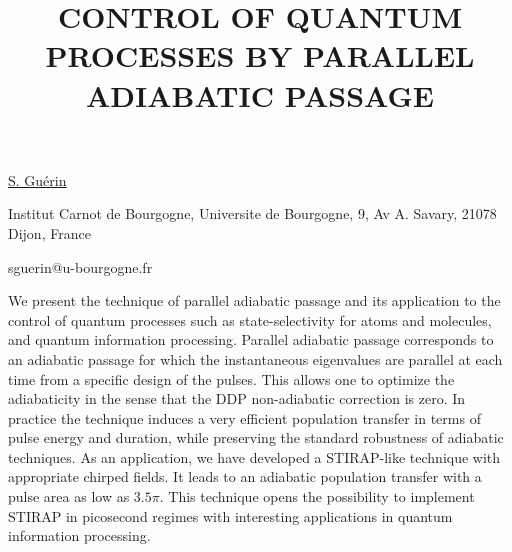 \title{CONTROL OF QUANTUM PROCESSES BY PARALLEL \mbox{ADIABATIC} \mbox{PASSAGE}}

\underline{S. Gu\'erin} 

{\normalsize{\vspace{-4mm}
Institut Carnot de Bourgogne, Universite de Bourgogne, 9, Av A.
Savary, 21078 Dijon, France

\email sguerin@u-bourgogne.fr}}

We present the technique of parallel adiabatic passage and its
application to the control of quantum processes such as
state-selectivity for atoms and molecules, and quantum information
processing. Parallel adiabatic passage corresponds to an adiabatic
passage for which the instantaneous eigenvalues are parallel at each
time from a specific design of the pulses. This allows one to
optimize the adiabaticity in the sense that the DDP non-adiabatic
correction is zero. In practice the technique induces a very
efficient population transfer in terms of pulse energy and duration,
while preserving the standard robustness of adiabatic techniques. As
an application, we have developed a STIRAP-like technique with
appropriate chirped fields. It leads to an adiabatic population
transfer with a pulse area as low as $3.5\pi$. This technique opens
the possibility to implement STIRAP in picosecond regimes with
interesting applications in quantum information processing.

\vspace{\baselineskip}